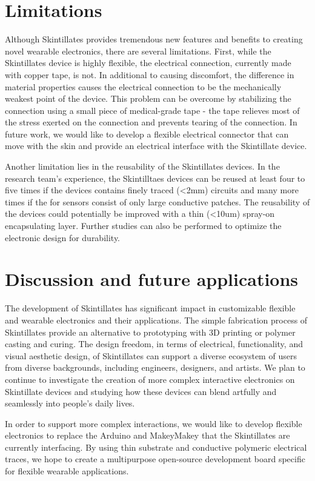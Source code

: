 \documentclass{sigchi}
\begin{document}
\section {Limitations}
Although Skintillates provides tremendous new features and benefits to creating novel wearable electronics, there are several limitations. First, while the Skintillates device is highly flexible, the electrical connection, currently made with copper tape, is not. In additional to causing discomfort, the difference in material  properties causes the electrical connection to be the mechanically weakest point of the device. This problem can be overcome by stabilizing the connection using a small piece of medical-grade tape - the tape relieves most of the stress exerted on the connection and prevents tearing of the connection. In future work, we would like to develop a flexible electrical connector that can move with the skin and provide an electrical interface with the Skintillate device. 

Another limitation lies in the reusability of the Skintillates devices. In the research team's experience, the Skintilltaes devices can be reused at least four to five times if the devices contains finely traced (\textless 2mm) circuits and many more times if the for sensors consist of only large conductive patches. The reusability of the devices could potentially be improved with a thin (\textless10um) spray-on encapsulating layer. Further studies can also be performed to optimize the electronic design for durability. 

\section {Discussion and future applications}
The development of Skintillates has significant impact in customizable flexible and wearable electronics and their applications. The simple fabrication process of Skintillates provide an alternative to prototyping with 3D printing or polymer casting and curing.  The design freedom, in terms of electrical, functionality, and visual aesthetic design, of Skintillates can support a diverse ecosystem of users from diverse backgrounds, including engineers, designers, and artists. We plan to continue to investigate the creation of more complex interactive electronics on Skintillate devices and studying how these devices can blend artfully and seamlessly into people's daily lives. 

In order to support more complex interactions, we would like to develop flexible electronics to replace the Arduino and MakeyMakey that the Skintillates are currently interfacing. By using thin substrate and conductive polymeric electrical traces, we hope to create a multipurpose open-source development board specific for flexible wearable applications. 
\end{document}
